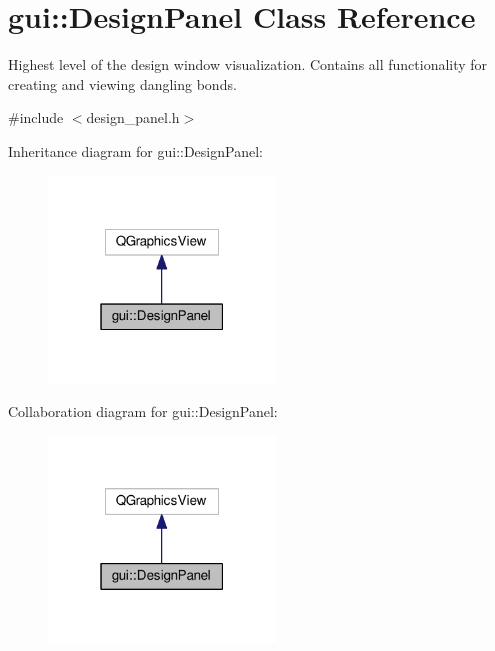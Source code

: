 \hypertarget{classgui_1_1DesignPanel}{}\section{gui\+:\+:Design\+Panel Class Reference}
\label{classgui_1_1DesignPanel}


Highest level of the design window visualization. Contains all functionality for creating and viewing dangling bonds.  




{\ttfamily \#include $<$design\+\_\+panel.\+h$>$}



Inheritance diagram for gui\+:\+:Design\+Panel\+:\nopagebreak
\begin{figure}[H]
\begin{center}
\leavevmode
\includegraphics[width=171pt]{classgui_1_1DesignPanel__inherit__graph}
\end{center}
\end{figure}


Collaboration diagram for gui\+:\+:Design\+Panel\+:\nopagebreak
\begin{figure}[H]
\begin{center}
\leavevmode
\includegraphics[width=171pt]{classgui_1_1DesignPanel__coll__graph}
\end{center}
\end{figure}
